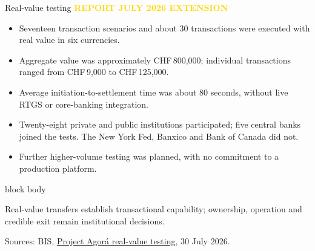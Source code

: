 \documentclass[aspectratio=169,12pt]{beamer}
\newcommand{\source}[1]{\vfill\par\fontsize{5.4}{6.5}\selectfont\color{Quiet}Sources: #1}
\newcommand{\tightitems}{\setlength{\itemsep}{0.42em}\setlength{\parskip}{0pt}}
\newcommand{\reporttag}[1]{\textcolor{Gold}{\fontsize{7.2}{8.5}\selectfont\bfseries REPORT #1}}
\newenvironment{statement}{%
  \begin{beamercolorbox}[sep=.18cm,rounded=false,wd=\linewidth]{block body}%
  \fontsize{13}{15.5}\selectfont\bfseries
}{\end{beamercolorbox}}
\begin{document}
\begin{frame}[shrink=30]{Real-value testing}
  \reporttag{JULY 2026 EXTENSION}\par\vspace{0.08cm}
  \begin{itemize}\tightitems
    \item Seventeen transaction scenarios and about 30 transactions were executed with real value in six currencies.
    \item Aggregate value was approximately CHF\,800{,}000; individual transactions ranged from CHF\,9{,}000 to CHF\,125{,}000.
    \item Average initiation-to-settlement time was about 80 seconds, without live RTGS or core-banking integration.
    \item Twenty-eight private and public institutions participated; five central banks joined the tests. The New York Fed, Banxico and Bank of Canada did not.
    \item Further higher-volume testing was planned, with no commitment to a production platform.
  \end{itemize}
  \begin{statement}
    Real-value transfers establish transactional capability; ownership, operation and credible exit remain institutional decisions.
  \end{statement}
  \source{BIS, \href{https://www.bis.org/about/bisih/topics/fmis/agora/rvt.htm}{Project Agor\'a real-value testing}, 30 July 2026.}
\end{frame}
\end{document}

